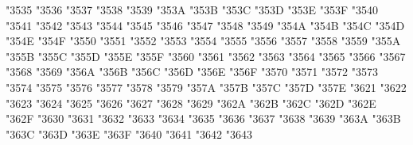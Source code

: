 {\Uchar\jis"3535 %
\Uchar\jis"3536 %
\Uchar\jis"3537 %
\Uchar\jis"3538 %
\Uchar\jis"3539 %
\Uchar\jis"353A %
\Uchar\jis"353B %
\Uchar\jis"353C %
\Uchar\jis"353D %
\Uchar\jis"353E %
\Uchar\jis"353F %
\Uchar\jis"3540 %
\Uchar\jis"3541 %
\Uchar\jis"3542 %
\Uchar\jis"3543 %
\Uchar\jis"3544 %
\Uchar\jis"3545 %
\Uchar\jis"3546 %
\Uchar\jis"3547 %
\Uchar\jis"3548 %
\Uchar\jis"3549 %
\Uchar\jis"354A %
\Uchar\jis"354B %
\Uchar\jis"354C %
\Uchar\jis"354D %
\Uchar\jis"354E %
\Uchar\jis"354F %
\Uchar\jis"3550 %
\Uchar\jis"3551 %
\Uchar\jis"3552 %
\Uchar\jis"3553 %
\Uchar\jis"3554 %
\Uchar\jis"3555 %
\Uchar\jis"3556 %
\Uchar\jis"3557 %
\Uchar\jis"3558 %
\Uchar\jis"3559 %
\Uchar\jis"355A %
\Uchar\jis"355B %
\Uchar\jis"355C %
\Uchar\jis"355D %
\Uchar\jis"355E %
\Uchar\jis"355F %
\Uchar\jis"3560 %
\Uchar\jis"3561 %
\Uchar\jis"3562 %
\Uchar\jis"3563 %
\Uchar\jis"3564 %
\Uchar\jis"3565 %
\Uchar\jis"3566 %
\Uchar\jis"3567 %
\Uchar\jis"3568 %
\Uchar\jis"3569 %
\Uchar\jis"356A %
\Uchar\jis"356B %
\Uchar\jis"356C %
\Uchar\jis"356D %
\Uchar\jis"356E %
\Uchar\jis"356F %
\Uchar\jis"3570 %
\Uchar\jis"3571 %
\Uchar\jis"3572 %
\Uchar\jis"3573 %
\Uchar\jis"3574 %
\Uchar\jis"3575 %
\Uchar\jis"3576 %
\Uchar\jis"3577 %
\Uchar\jis"3578 %
\Uchar\jis"3579 %
\Uchar\jis"357A %
\Uchar\jis"357B %
\Uchar\jis"357C %
\Uchar\jis"357D %
\Uchar\jis"357E %
\Uchar\jis"3621 %
\Uchar\jis"3622 %
\Uchar\jis"3623 %
\Uchar\jis"3624 %
\Uchar\jis"3625 %
\Uchar\jis"3626 %
\Uchar\jis"3627 %
\Uchar\jis"3628 %
\Uchar\jis"3629 %
\Uchar\jis"362A %
\Uchar\jis"362B %
\Uchar\jis"362C %
\Uchar\jis"362D %
\Uchar\jis"362E %
\Uchar\jis"362F %
\Uchar\jis"3630 %
\Uchar\jis"3631 %
\Uchar\jis"3632 %
\Uchar\jis"3633 %
\Uchar\jis"3634 %
\Uchar\jis"3635 %
\Uchar\jis"3636 %
\Uchar\jis"3637 %
\Uchar\jis"3638 %
\Uchar\jis"3639 %
\Uchar\jis"363A %
\Uchar\jis"363B %
\Uchar\jis"363C %
\Uchar\jis"363D %
\Uchar\jis"363E %
\Uchar\jis"363F %
\Uchar\jis"3640 %
\Uchar\jis"3641 %
\Uchar\jis"3642 %
\Uchar\jis"3643 %
}
